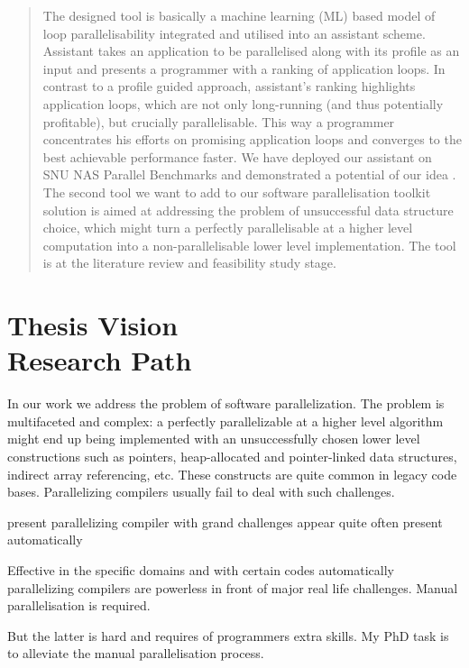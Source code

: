 \documentclass[10pt,a4paper]{report}
\begin{document}
\begin{abstract}
\quad The designed tool is basically a machine learning (ML) based model of loop parallelisability integrated and utilised into an assistant scheme. Assistant takes an application to be parallelised along with its profile as an input and presents a programmer with a ranking of application loops. In contrast to a profile guided approach, assistant's ranking highlights application loops, which are not only long-running (and thus potentially profitable), but crucially parallelisable. This way a programmer concentrates his efforts on promising application loops and converges to the best achievable performance faster. We have deployed our assistant on SNU NAS Parallel Benchmarks \cite{snu-npb-benchmarks} \cite{nasa-parallel-benchmarks} and demonstrated a potential of our idea \cite{aiseps}.\newline\null
\quad The second tool we want to add to our software parallelisation toolkit solution is aimed at addressing the problem of unsuccessful data structure choice, which might turn a perfectly parallelisable at a higher level computation into a non-parallelisable lower level implementation. The tool is at the literature review and feasibility study stage.
\end{abstract}

\chapter{Thesis Vision\\{\Large Research Path}}
\quad In our work we address the problem of software parallelization. The problem is multifaceted and complex: a perfectly parallelizable at a higher level algorithm might end up being implemented with an unsuccessfully chosen lower level constructions such as pointers, heap-allocated and pointer-linked data structures, indirect array referencing, etc. These constructs are quite common in legacy code bases. Parallelizing compilers usually fail to deal with such challenges.   

present parallelizing compiler with grand challenges appear quite often  present automatically  

Effective in the specific domains and with certain codes automatically parallelizing compilers are powerless in front of major real life challenges. Manual parallelisation is required. 

But the latter is hard and requires of programmers extra skills. My PhD task is to alleviate the manual parallelisation process.\newline\null
\end{document}
